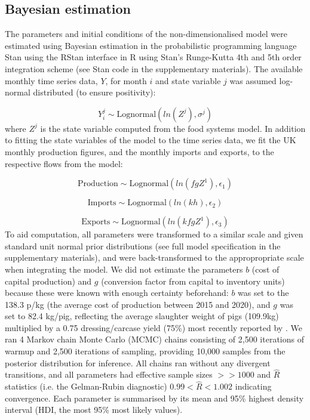 \documentclass[9pt,twocolumn,twoside,lineno]{pnas-new}
\begin{document}
{\subsection*{Bayesian estimation}
The parameters and initial conditions of the non-dimensionalised model were estimated using Bayesian estimation in the probabilistic programming language Stan \cite{carpenter2017} using the RStan interface in R \cite{stan2019,rcoreteam2020} using Stan's Runge-Kutta 4th and 5th order integration scheme (see Stan code in the supplementary materials). The available monthly time series data, $Y$, for month $i$ and state variable $j$ was assumed log-normal distributed (to ensure positivity):

\begin{equation}
  Y_{i}^{j} \sim \text{Lognormal}( ln( Z^{j} ), \sigma^{j})
\end{equation}
%
where $Z^{j}$ is the state variable computed from the food systems model. In addition to fitting the state variables of the model to the time series data, we fit the UK monthly production figures, and the monthly imports and exports, to the respective flows from the model:

\begin{equation}
  \text{Production} \sim \text{Lognormal}( ln( f g Z^{1} ), \epsilon_{1})
\end{equation}

\begin{equation}
  \text{Imports} \sim \text{Lognormal}( ln( k h ), \epsilon_{2})
\end{equation}

\begin{equation}
  \text{Exports} \sim \text{Lognormal}( ln( k f g Z^{1} ), \epsilon_{3})
\end{equation}
%
To aid computation, all parameters were transformed to a similar scale and given standard unit normal prior distributions (see full model specification in the supplementary materials), and were back-transformed to the appropropriate scale when integrating the model. We did not estimate the parameters $b$ (cost of capital production) and $g$ (conversion factor from capital to inventory units) because these were known with enough certainty beforehand: $b$ was set to the 138.3 p/kg (the average cost of production between 2015 and 2020), and $g$ was set to 82.4 kg/pig, reflecting the average slaughter weight of pigs (109.9kg) multiplied by a 0.75 dressing/carcase yield (75\%) most recently reported by \cite{AHDBpocketbook2018}. We ran 4 Markov chain Monte Carlo (MCMC) chains consisting of 2,500 iterations of warmup and 2,500 iterations of sampling, providing 10,000 samples from the posterior distribution for inference. All chains ran without any divergent transitions, and all parameters had effective sample sizes $>> 1000$ and $\hat{R}$ statistics (i.e. the Gelman-Rubin diagnostic) $0.99 < \hat{R} < 1.002$ indicating convergence. Each parameter is summarised by its mean and 95\% highest density interval (HDI, the most 95\% most likely values). 

}
\end{document}
